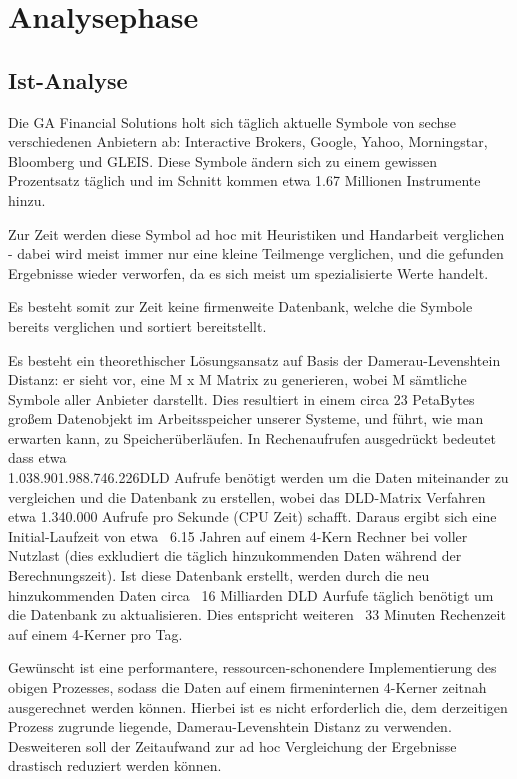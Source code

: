 \section{Analysephase}
\subsection{Ist-Analyse}
Die GA Financial Solutions holt sich täglich aktuelle Symbole von sechse verschiedenen
Anbietern ab: Interactive Brokers\cite{IB}, Google, Yahoo, Morningstar, Bloomberg und GLEIS.
Diese Symbole ändern sich zu einem gewissen Prozentsatz täglich und im Schnitt kommen etwa
1.67 Millionen Instrumente hinzu.\par

Zur Zeit werden diese Symbol ad hoc mit Heuristiken und Handarbeit verglichen -
dabei wird meist immer nur eine kleine Teilmenge verglichen, und die gefunden Ergebnisse
wieder verworfen, da es sich meist um spezialisierte Werte handelt.\par

Es besteht somit zur Zeit keine firmenweite Datenbank, welche die Symbole
bereits verglichen und sortiert bereitstellt.\par

Es besteht ein theorethischer Lösungsansatz auf Basis der Damerau-Levenshtein Distanz\footnotemark:
er sieht vor, eine M x M Matrix zu generieren, wobei M sämtliche Symbole aller
Anbieter darstellt. Dies resultiert in einem circa 23 PetaBytes großem Datenobjekt
im Arbeitsspeicher unserer Systeme, und führt, wie man erwarten kann, zu Speicherüberläufen.
In Rechenaufrufen ausgedrückt bedeutet dass etwa \\
1.038.901.988.746.226\footnotemark DLD Aufrufe benötigt werden um die Daten miteinander 
zu vergleichen und die Datenbank zu erstellen, wobei das DLD-Matrix Verfahren 
etwa 1.340.000 Aufrufe pro Sekunde (CPU Zeit) schafft.
Daraus ergibt sich eine Initial-Laufzeit von etwa ~6.15 Jahren auf einem 4-Kern
Rechner bei voller Nutzlast (dies exkludiert die täglich hinzukommenden Daten
während der Berechnungszeit). Ist diese Datenbank erstellt, werden durch die neu
hinzukommenden Daten circa ~16 Milliarden DLD Aurfufe täglich benötigt um die
Datenbank zu aktualisieren. Dies entspricht weiteren ~33 Minuten Rechenzeit auf
einem 4-Kerner pro Tag.\par

Gewünscht ist eine performantere, ressourcen-schonendere Implementierung des obigen Prozesses,
sodass die Daten auf einem firmeninternen 4-Kerner zeitnah ausgerechnet werden können.
Hierbei ist es nicht erforderlich die, dem derzeitigen Prozess zugrunde liegende,
Damerau-Levenshtein Distanz zu verwenden. Desweiteren soll der Zeitaufwand zur ad hoc 
Vergleichung der Ergebnisse drastisch reduziert werden können.\par

